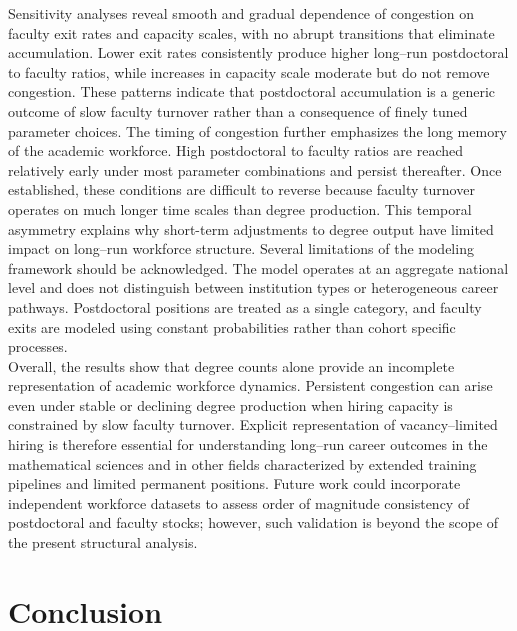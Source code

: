 \documentclass[3p]{elsarticle}%
\theoremstyle{definition}
\begin{document}
 \noindent Sensitivity analyses reveal smooth and gradual dependence of congestion on faculty exit rates and capacity scales, with no abrupt transitions that eliminate accumulation. Lower exit rates consistently produce higher long--run postdoctoral to faculty ratios, while increases in capacity scale moderate but do not remove congestion. These patterns indicate that postdoctoral accumulation is a generic outcome of slow faculty turnover rather than a consequence of finely tuned parameter choices. The timing of congestion further emphasizes the long memory of the academic workforce. High postdoctoral to faculty ratios are reached relatively early under most parameter combinations and persist thereafter. Once established, these conditions are difficult to reverse because faculty turnover operates on much longer time scales than degree production. This temporal asymmetry explains why short-term adjustments to degree output have limited impact on long--run workforce structure. Several limitations of the modeling framework should be acknowledged. The model operates at an aggregate national level and does not distinguish between institution types or heterogeneous career pathways. Postdoctoral positions are treated as a single category, and faculty exits are modeled using constant probabilities rather than cohort specific processes. \\
 
 \noindent Overall, the results show that degree counts alone provide an incomplete representation of academic workforce dynamics. Persistent congestion can arise even under stable or declining degree production when hiring capacity is constrained by slow faculty turnover. Explicit representation of vacancy--limited hiring is therefore essential for understanding long--run career outcomes in the mathematical sciences and in other fields characterized by extended training pipelines and limited permanent positions. Future work could incorporate independent workforce datasets to assess order of magnitude consistency of postdoctoral and faculty stocks; however, such validation is beyond the scope of the present structural analysis.

\section{Conclusion}\label{sec5}
\end{document}
